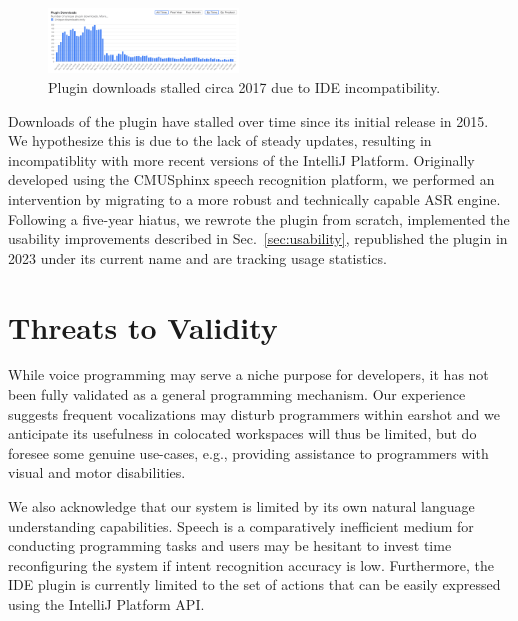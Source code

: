 \documentclass[conference]{IEEEtran}
\begin{document}
\begin{figure}[ht!]
    \centering
    \includegraphics[width=0.45\textwidth]{downloads.png}
    \caption{Plugin downloads stalled circa 2017 due to IDE incompatibility.}
\end{figure}

Downloads of the plugin have stalled over time since its initial release in 2015. We hypothesize this is due to the lack of steady updates, resulting in incompatiblity with more recent versions of the IntelliJ Platform. Originally developed using the CMUSphinx speech recognition platform, we performed an intervention by migrating to a more robust and technically capable ASR engine. Following a five-year hiatus, we rewrote the plugin from scratch, implemented the usability improvements described in Sec.~\ref{sec:usability}, republished the plugin in 2023 under its current name and are tracking usage statistics.



\section{Threats to Validity}

While voice programming may serve a niche purpose for developers, it has not been fully validated as a general programming mechanism. Our experience suggests frequent vocalizations may disturb programmers within earshot and we anticipate its usefulness in colocated workspaces will thus be limited, but do foresee some genuine use-cases, e.g., providing assistance to programmers with visual and motor disabilities.

We also acknowledge that our system is limited by its own natural language understanding capabilities. Speech is a comparatively inefficient medium for conducting programming tasks and users may be hesitant to invest time reconfiguring the system if intent recognition accuracy is low. Furthermore, the IDE plugin is currently limited to the set of actions that can be easily expressed using the IntelliJ Platform API.
\end{document}
